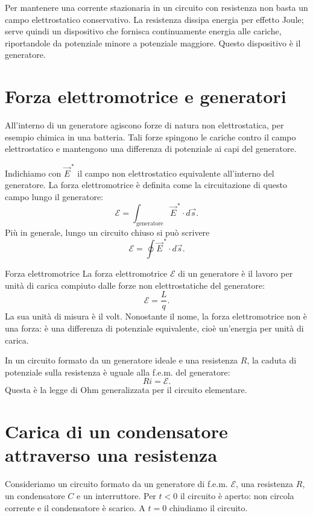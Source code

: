 \documentclass[a4paper]{article}
\begin{document}
Per mantenere una corrente stazionaria in un circuito con resistenza non basta un campo elettrostatico conservativo. La resistenza dissipa energia per effetto Joule; serve quindi un dispositivo che fornisca continuamente energia alle cariche, riportandole da potenziale minore a potenziale maggiore. Questo dispositivo è il generatore.

\section{Forza elettromotrice e generatori}

All'interno di un generatore agiscono forze di natura non elettrostatica, per esempio chimica in una batteria. Tali forze spingono le cariche contro il campo elettrostatico e mantengono una differenza di potenziale ai capi del generatore.

Indichiamo con \(\vec{E}^{\,*}\) il campo non elettrostatico equivalente all'interno del generatore. La forza elettromotrice è definita come la circuitazione di questo campo lungo il generatore:
\[
    \mathcal{E}=\int_{\text{generatore}} \vec{E}^{\,*}\cdot d\vec{s}.
\]
Più in generale, lungo un circuito chiuso si può scrivere
\[
    \mathcal{E}=\oint \vec{E}^{\,*}\cdot d\vec{s}.
\]

\begin{snippetdefinition}{Forza elettromotrice}
    La forza elettromotrice \(\mathcal{E}\) di un generatore è il lavoro per unità di carica compiuto dalle forze non elettrostatiche del generatore:
    \[
        \mathcal{E}=\frac{L}{q}.
    \]
    La sua unità di misura è il volt. Nonostante il nome, la forza elettromotrice non è una forza: è una differenza di potenziale equivalente, cioè un'energia per unità di carica.
\end{snippetdefinition}

In un circuito formato da un generatore ideale e una resistenza \(R\), la caduta di potenziale sulla resistenza è uguale alla f.e.m. del generatore:
\[
    Ri=\mathcal{E}.
\]
Questa è la legge di Ohm generalizzata per il circuito elementare.

\section{Carica di un condensatore attraverso una resistenza}

Consideriamo un circuito formato da un generatore di f.e.m. \(\mathcal{E}\), una resistenza \(R\), un condensatore \(C\) e un interruttore. Per \(t<0\) il circuito è aperto: non circola corrente e il condensatore è scarico. A \(t=0\) chiudiamo il circuito.
\end{document}
